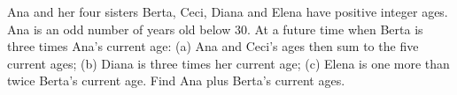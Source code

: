Ana and her four sisters Berta, Ceci, Diana and Elena have positive integer ages. Ana is an odd number of years old below $30$. At a future time when Berta is three times Ana's current age: (a) Ana and Ceci's ages then sum to the five current ages; (b) Diana is three times her current age; (c) Elena is one more than twice Berta's current age. Find Ana plus Berta's current ages.
